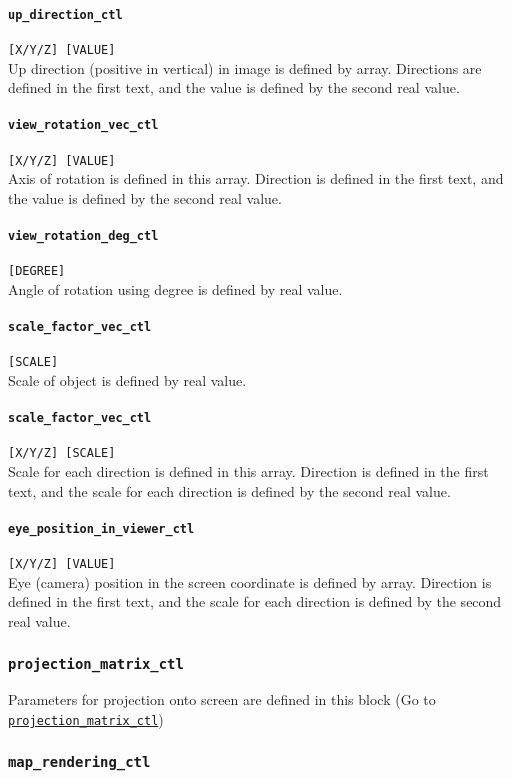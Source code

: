 \paragraph{\tt up\_direction\_ctl}
\label{href_t:up_direction_ctl}  
\verb|[X/Y/Z] [VALUE]| \\
Up direction (positive in vertical) in image is defined by array. Directions are defined in the first text, and the value is defined by the second real value.
%
\paragraph{\tt view\_rotation\_vec\_ctl}
\label{href_t:view_rotation_vec_ctl}  
\verb|[X/Y/Z] [VALUE]| \\
Axis of rotation is defined in this array. Direction is defined in the first text, and the value is defined by the second real value.
%
\paragraph{\tt view\_rotation\_deg\_ctl}
\label{href_t:view_rotation_deg_ctl}  
\verb|[DEGREE]| \\
Angle of rotation using degree is defined by real value.
%
\paragraph{\tt scale\_factor\_vec\_ctl}
\label{href_t:scale_factor_ctl}  
\verb|[SCALE]| \\
Scale of object is defined by real value.
%
\paragraph{\tt scale\_factor\_vec\_ctl}
\label{href_t:scale_factor_vec_ctl}  
\verb|[X/Y/Z] [SCALE]| \\
Scale for each direction is defined in this array. Direction is defined in the first text, and the scale for each direction is defined by the second real value.
%
\paragraph{\tt eye\_position\_in\_viewer\_ctl}
\label{href_t:eye_position_in_viewer_ctl}  
\verb|[X/Y/Z] [VALUE]| \\
Eye (camera) position in the screen coordinate is defined by array. Direction is defined in the first text, and the scale for each direction is defined by the second real value.
%
%
\subsubsection{\tt projection\_matrix\_ctl}
\label{href_t:projection_matrix_ctl}
Parameters for projection onto screen are defined in this block (Go to \hyperref[href_i:projection_matrix_ctl] {\tt projection\_matrix\_ctl})

%
\subsubsection{\tt map\_rendering\_ctl}
\label{href_t:map_rendering_ctl}
%


